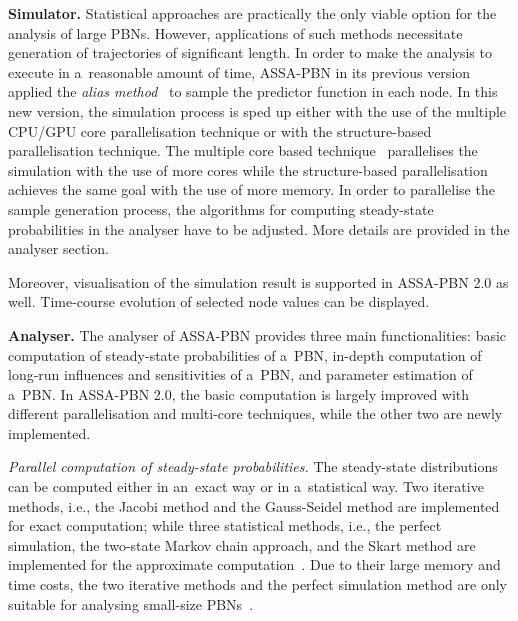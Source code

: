 \documentclass[runningheads,a4paper]{llncs}
\begin{document}
\medskip\noindent
{\bf Simulator.}
Statistical approaches are practically the only viable option for the analysis of large PBNs.
However, applications of such methods necessitate generation of trajectories of significant length.
In order to make the analysis to execute in a~reasonable amount of time,
{\sf ASSA-PBN} in its previous version applied the \emph{alias  method}~\cite{WAJ77} to sample the predictor function in each node.
In this new version,
the simulation process is sped up either with the use of the multiple CPU/GPU core parallelisation
technique or with the structure-based parallelisation technique.
The multiple core based technique~\cite{MPY15b} parallelises the simulation with the use of more cores while
the structure-based parallelisation~\cite{MPY16a} achieves the same goal with the use of more memory.
In order to parallelise the sample generation process,
the algorithms for computing steady-state probabilities in the analyser have to be adjusted.
More details are provided in the analyser section.

Moreover, visualisation of the simulation result is supported in {\sf ASSA-PBN} 2.0 as
well. Time-course evolution of selected node values can be displayed.

\medskip\noindent
{\bf Analyser.}
The analyser of {\sf ASSA-PBN} provides three main functionalities:
basic computation of steady-state probabilities of a~PBN,
in-depth computation of long-run influences and sensitivities of a~PBN,
and parameter estimation of a~PBN.
In {\sf ASSA-PBN} 2.0,
the basic computation is largely improved with different parallelisation and multi-core techniques,
while the other two are newly implemented.

\smallskip\noindent
\emph{Parallel computation of steady-state probabilities.}
The steady-state distributions can be computed either in an~exact way or in a~statistical way.
Two iterative methods, i.e., the Jacobi method and the Gauss-Seidel method are implemented for exact computation;
while three statistical methods, i.e., the perfect simulation, the two-state Markov chain approach,
and the Skart method are implemented for the approximate computation~\cite{assa}.
Due to their large memory and time costs,
the two iterative methods and the perfect simulation method are only suitable for analysing small-size PBNs~\cite{assa}.
\end{document}
